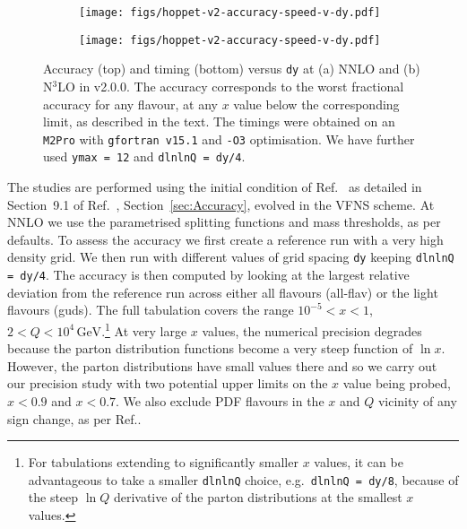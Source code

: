 \begin{figure}[htbp]
    \centering
    \begin{subfigure}{0.49\textwidth}
        \centering
        \texttt{[image: figs/hoppet-v2-accuracy-speed-v-dy.pdf]}
        \caption{}
        \label{fig:sub1}
    \end{subfigure}
    \hfill
    \begin{subfigure}{0.49\textwidth}
        \centering
        \texttt{[image: figs/hoppet-v2-accuracy-speed-v-dy.pdf]}
        \caption{}
        \label{fig:sub2}
    \end{subfigure}
    \caption{Accuracy (top) and timing (bottom) versus \texttt{dy} at
      (a) NNLO and (b) N$^3$LO in \hoppet{} v2.0.0.
      The accuracy corresponds to the worst fractional accuracy for any flavour,
      at any $x$ value below the corresponding limit, as described in
      the text.
      The timings were
      obtained on an \texttt{M2Pro} with \texttt{gfortran v15.1} and
      \texttt{-O3} optimisation. We have further used \texttt{ymax = 12} and
      \texttt{dlnlnQ = dy/4}.
         }
    \label{fig:main}
\end{figure}

The studies are performed using the initial condition of
Ref.~\cite{Dittmar:2005ed} as detailed in
%
\ifreleasenote
Section~9.1 of Ref.~\cite{Salam:2008qg},
\else
Section~\ref{sec:Accuracy},
\fi
%
evolved in the VFNS scheme.
%
At NNLO we use the parametrised splitting
functions and mass thresholds, as per \hoppet defaults.
%
To
assess the accuracy we first create a reference run with a very high
density grid. We then run \hoppet{} with different values of grid
spacing \texttt{dy} keeping \texttt{dlnlnQ = dy/4}.
%
The accuracy is then computed by looking at the largest relative
deviation from the reference run across either all flavours (all-flav)
or the light flavours (guds).
%
The full tabulation covers the range $10^{-5} < x < 1$,
$2 < Q < 10^4\, \text{GeV}$.\footnote{For tabulations extending to
  significantly smaller $x$ values, it can be advantageous to take a
  smaller \texttt{dlnlnQ} choice, e.g.\ \texttt{dlnlnQ = dy/8},
  because of the steep $\ln Q$ derivative of the parton
  distributions at the smallest $x$ values.}
%
At very large $x$ values, the numerical precision degrades because the
parton distribution functions become a very steep function of $\ln
x$.
%
However, the parton distributions have small values there and so we
carry out our precision study with two potential upper limits on the
$x$ value being probed, $x < 0.9$ and $x < 0.7$.
%
We also exclude PDF flavours in the $x$ and $Q$ vicinity of any sign
change, as per Ref.\cite{Salam:2008qg}.

